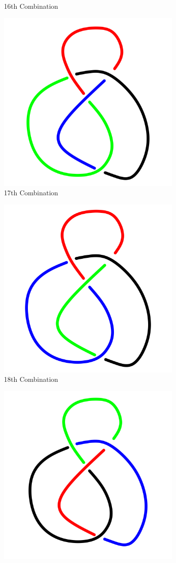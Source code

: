 \documentclass[a4paper,9pt]{article}
\begin{document}
\begin{enumerate}
\begin{figure}[h!]
\begin{subfigure}[b]{0.25\linewidth}
	\caption{16th Combination}
\end{subfigure}
\qquad
\begin{subfigure}[b]{0.25\linewidth}
	\centering
	\includegraphics[width=0.5\linewidth]{picture/knotpict/knot-17}
	\caption{17th Combination}
\end{subfigure}
\qquad
\begin{subfigure}[b]{0.25\linewidth}
	\centering
	\includegraphics[width=0.5\linewidth]{picture/knotpict/knot-18}
	\caption{18th Combination}
\end{subfigure}
\qquad
\begin{subfigure}[b]{0.25\linewidth}
	\centering
	\includegraphics[width=0.5\linewidth]{picture/knotpict/knot-19}

\end{subfigure}
\end{figure}
\end{enumerate}
\end{document}
